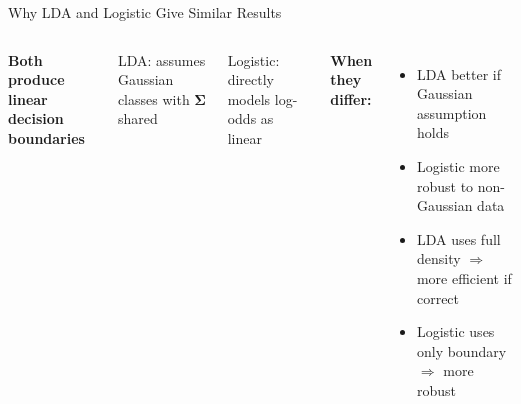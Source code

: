\documentclass[aspectratio=169, 11pt]{beamer}
\begin{document}
\begin{frame}{Why LDA and Logistic Give Similar Results}

\begin{columns}
\textbf{Both produce linear decision boundaries}

\vspace{0.3em}
LDA: assumes Gaussian classes with $\boldsymbol{\Sigma}$ shared

Logistic: directly models log-odds as linear

\vspace{0.5em}
\textbf{When they differ:}
\begin{itemize}
  \item LDA better if Gaussian assumption holds
  \item Logistic more robust to non-Gaussian data
  \item LDA uses full density $\Rightarrow$ more efficient if correct
  \item Logistic uses only boundary $\Rightarrow$ more robust
\end{itemize}

\end{columns}
\end{frame}
\end{document}
